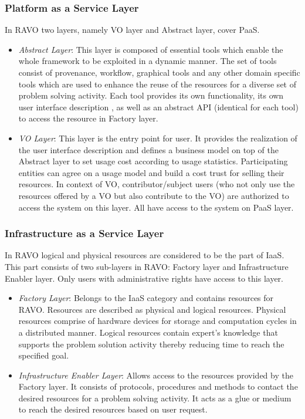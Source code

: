 \documentclass[]{article}
\begin{document}
\subsubsection{\large{Platform as a Service Layer}}

In RAVO two layers, namely VO layer and Abstract layer, cover PaaS.
\begin{itemize}
\item
\emph{Abstract Layer}: This layer is composed of essential tools which enable the whole framework to be exploited in a dynamic manner. The set of tools consist of provenance, workflow, graphical tools and any other domain specific tools which are used to enhance the reuse of the resources for a diverse set of problem solving activity. Each tool provides its own functionality, its own user interface description \cite{Altafwcci}, as well as an abstract API (identical for each tool) to access the resource in Factory layer.
\item \emph{VO Layer}: This layer is the entry point for user. It provides the realization of the user interface description and defines a business model on top of the Abstract layer to set usage cost according to usage statistics. Participating entities can agree on a usage model and build a cost trust for selling their resources. In context of VO, contributor/subject users (who not only use the resources offered by a VO but also contribute to the VO) are authorized to access the system on this layer. All have access to the system on PaaS layer.
\end{itemize}

\subsubsection{\large{Infrastructure as a Service Layer}}

 In RAVO logical and physical resources are considered to be the part of IaaS. This part consists of two sub-layers in RAVO: Factory layer and Infrastructure Enabler layer. Only users with administrative rights have access to this layer.
\begin{itemize}
\item \emph{Factory Layer}: Belongs to the IaaS category and contains resources for  RAVO. Resources are described as physical and logical resources. Physical resources comprise of hardware devices for storage and computation cycles in a distributed manner. Logical resources contain expert's knowledge that supports the problem solution activity thereby reducing time to reach the specified goal.
\item \emph{Infrastructure Enabler Layer}: Allows access to the resources provided by the Factory layer. It consists of protocols, procedures and methods to contact the desired resources for a problem solving activity. It acts as a glue or medium to reach the desired resources based on user request.
\end{itemize}
\end{document}
